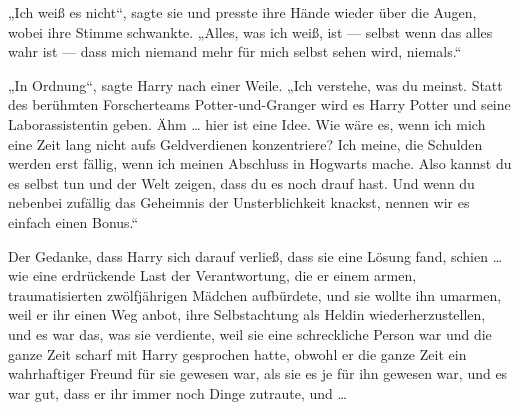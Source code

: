 „Ich weiß es nicht“, sagte sie und presste ihre Hände wieder über die Augen, wobei ihre Stimme schwankte.
„Alles, was ich weiß, ist — selbst wenn das alles wahr ist — dass mich niemand mehr für mich selbst sehen wird, niemals.“

„In Ordnung“, sagte Harry nach einer Weile.
„Ich verstehe, was du meinst. Statt des berühmten Forscherteams Potter-und-Granger wird es Harry Potter und seine Laborassistentin geben. Ähm … hier ist eine Idee. Wie wäre es, wenn ich mich eine Zeit lang nicht aufs Geldverdienen konzentriere? Ich meine, die Schulden werden erst fällig, wenn ich meinen Abschluss in Hogwarts mache. Also kannst du es selbst tun und der Welt zeigen, dass du es noch drauf hast. Und wenn du nebenbei zufällig das Geheimnis der Unsterblichkeit knackst, nennen wir es einfach einen Bonus.“

Der Gedanke, dass Harry sich darauf verließ, dass sie eine Lösung fand, schien … wie eine erdrückende Last der Verantwortung, die er einem armen, traumatisierten zwölfjährigen Mädchen aufbürdete, und sie wollte ihn umarmen, weil er ihr einen Weg anbot, ihre Selbstachtung als Heldin wiederherzustellen, und es war das, was sie verdiente, weil sie eine schreckliche Person war und die ganze Zeit scharf mit Harry gesprochen hatte, obwohl er die ganze Zeit ein wahrhaftiger Freund für sie gewesen war, als sie es je für ihn gewesen war, und es war gut, dass er ihr immer noch Dinge zutraute, und …


